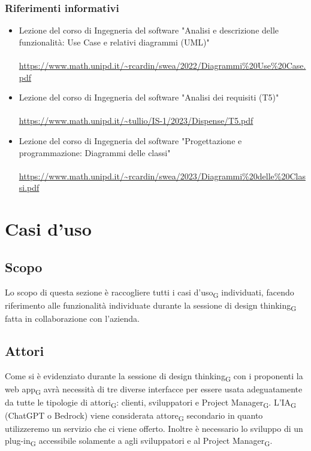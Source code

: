 \documentclass{article}
\begin{document}
\subsubsection{Riferimenti informativi}
\begin{itemize}
    \item Lezione del corso di Ingegneria del software "Analisi e descrizione delle funzionalità: Use Case e relativi diagrammi (UML)" \\ \\ \url{https://www.math.unipd.it/~rcardin/swea/2022/Diagrammi%20Use%20Case.pdf}
    \item Lezione del corso di Ingegneria del software "Analisi dei requisiti (T5)" \\ \\
    \url{https://www.math.unipd.it/~tullio/IS-1/2023/Dispense/T5.pdf}
    \item Lezione del corso di Ingegneria del software "Progettazione e programmazione: Diagrammi delle classi" \\ \\
\url{https://www.math.unipd.it/~rcardin/swea/2023/Diagrammi%20delle%20Classi.pdf}
    
    

\end{itemize}


\section*{Casi d'uso}
\subsection*{Scopo}
Lo scopo di questa sezione è raccogliere tutti i casi d'uso\textsubscript{G} individuati, facendo riferimento alle funzionalità individuate durante la sessione di design thinking\textsubscript{G} fatta in collaborazione con l'azienda.

\subsection*{Attori}
Come si è evidenziato durante la sessione di design thinking\textsubscript{G} con i proponenti la web app\textsubscript{G} avrà necessità di tre diverse interfacce per essere usata adeguatamente da tutte le tipologie di attori\textsubscript{G}: clienti, sviluppatori e Project Manager\textsubscript{G}. L'IA\textsubscript{G}  (ChatGPT o Bedrock) viene considerata attore\textsubscript{G} secondario in quanto utilizzeremo un servizio che ci viene offerto. Inoltre è necessario lo sviluppo di un plug-in\textsubscript{G} accessibile solamente a agli sviluppatori e al Project Manager\textsubscript{G}.\\\\
\end{document}
